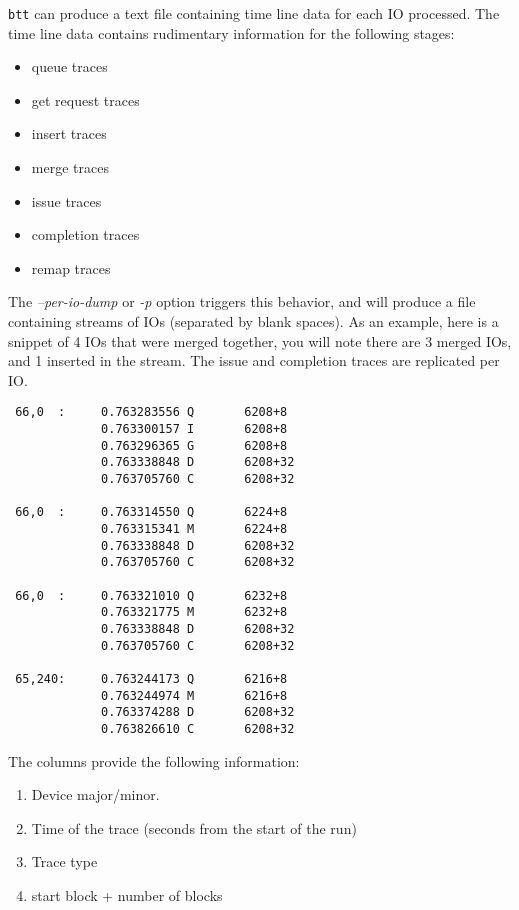 \documentclass{article}
\begin{document}
  \texttt{btt} can produce a text file containing time line data for each
  IO processed. The time line data contains rudimentary information for
  the following stages:

  \begin{itemize}
    \item queue traces
    \item get request traces
    \item insert traces
    \item merge traces
    \item issue traces
    \item completion traces
    \item remap traces
  \end{itemize}

  The \emph{--per-io-dump} or \emph{-p} option triggers this behavior,
  and will produce a file containing streams of IOs (separated by blank
  spaces). As an example, here is a snippet of 4 IOs that were merged
  together, you will note there are 3 merged IOs, and 1 inserted in the
  stream. The issue and completion traces are replicated per IO.

\begin{verbatim}
 66,0  :     0.763283556 Q       6208+8   
             0.763300157 I       6208+8   
             0.763296365 G       6208+8   
             0.763338848 D       6208+32  
             0.763705760 C       6208+32  

 66,0  :     0.763314550 Q       6224+8   
             0.763315341 M       6224+8   
             0.763338848 D       6208+32  
             0.763705760 C       6208+32  

 66,0  :     0.763321010 Q       6232+8   
             0.763321775 M       6232+8   
             0.763338848 D       6208+32  
             0.763705760 C       6208+32  

 65,240:     0.763244173 Q       6216+8   
             0.763244974 M       6216+8   
             0.763374288 D       6208+32  
             0.763826610 C       6208+32  
\end{verbatim}

  The columns provide the following information:

  \begin{enumerate}
    \item Device major/minor.

    \item Time of the trace (seconds from the start of the run)

    \item Trace type 

    \item start block + number of blocks
  \end{enumerate}
  
\end{document}
